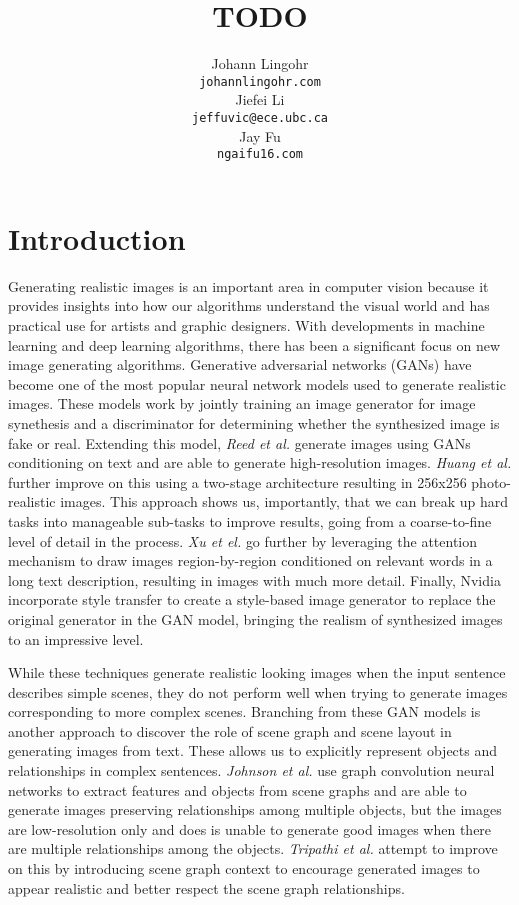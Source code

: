 \documentclass{article}
\title{TODO}
\author{%
  Johann Lingohr \\
  \texttt{johannlingohr\@gmail.com} \\
  \And
  Jiefei Li \\
  \texttt{jeffuvic@ece.ubc.ca} \\
  \And
  Jay Fu \\
  \texttt{ngaifu16\@gmail.com} \\
}
\begin{document}

\maketitle

\section{Introduction}

Generating realistic images is an important area in computer vision because it provides insights into how our algorithms understand the visual world and has practical use for artists and graphic designers. With developments in machine learning and deep learning algorithms, there has been a significant focus on new image generating algorithms. Generative adversarial networks (GANs) \cite{gan} have become one of the most popular neural network models used to generate realistic images. These models work by jointly training an image generator for image synethesis and a discriminator for determining whether the synthesized image is fake or real. Extending this model, \textit{Reed et al.} \cite{t2im} generate images using GANs conditioning on text and are able to generate high-resolution images. \textit{Huang et al.} \cite{stackedgan} further improve on this using a two-stage architecture resulting in 256x256 photo-realistic images. This approach shows us, importantly, that we can break up hard tasks into manageable sub-tasks to improve results, going from a coarse-to-fine level of detail in the process. \textit{Xu et el.} \cite{attengan} go further by leveraging the attention mechanism to draw images region-by-region conditioned on relevant words in a long text description, resulting in images with much more detail. Finally, Nvidia \cite{stylegan} incorporate style transfer to create a style-based image generator to replace the original generator in the GAN model, bringing the realism of synthesized images to an impressive level.

While these techniques generate realistic looking images when the input sentence describes simple scenes, they do not perform well when trying to generate images corresponding to more complex scenes. Branching from these GAN models is another approach to discover the role of scene graph and scene layout in generating images from text. These allows us to explicitly represent objects and relationships in complex sentences. \textit{Johnson et al.} \cite{sg2im} use graph convolution neural networks to extract features and objects from scene graphs and are able to generate images preserving relationships among multiple objects, but the images are low-resolution only and does is unable to generate good images when there are multiple relationships among the objects. \textit{Tripathi et al.} \cite{sg2imgcontext} attempt to improve on this by introducing scene graph context to encourage generated images to appear realistic and better respect the scene graph relationships.
\end{document}
